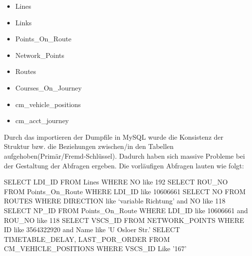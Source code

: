 \documentclass[a4paper, 12pt]{scrartcl}
\begin{document}
\begin{itemize} 
\item Lines
\item Links
\item Points\_On\_Route
\item Network\_Points
\item Routes
\item Courses\_On\_Journey
\item cm\_vehicle\_positions
\item cm\_acct\_journey
\end{itemize}

\newline
\dnewline Durch das importieren der Dumpfile in MySQL wurde die Konsistenz der Struktur bzw. die Beziehungen zwischen/in den Tabellen aufgehoben(Primär/Fremd-Schlüssel).
\newline
Dadurch haben sich massive Probleme bei der Gestaltung der Abfragen ergeben.
\newline
\newline
Die vorläufigen Abfragen lauten wie folgt:
\newline
\begin{small}
\newline SELECT LDI\_ID
\newline FROM Lines
\newline WHERE NO like 192
\newline 
\newline SELECT ROU\_NO
\newline FROM Points\_On\_Route
\newline WHERE LDI\_ID like 10606661 
\newline
\newline SELECT NO
\newline FROM ROUTES
\newline WHERE DIRECTION like ‘variable Richtung’ and NO like 118
\newline 
\newline SELECT NP\_ID
\newline FROM Points\_On\_Route
\newline WHERE LDI\_ID like 10606661 and ROU\_NO like 118
\newline
\newline SELECT VSCS\_ID
\newline FROM NETWORK\_POINTS
\newline WHERE ID like 3564322920 and Name like 'U Osloer Str.'
\newline 
\newline SELECT TIMETABLE\_DELAY, LAST\_POR\_ORDER
\newline FROM CM\_VEHICLE\_POSITIONS
\newline WHERE VSCS\_ID Like '167'
\end{small}
\end{document}
